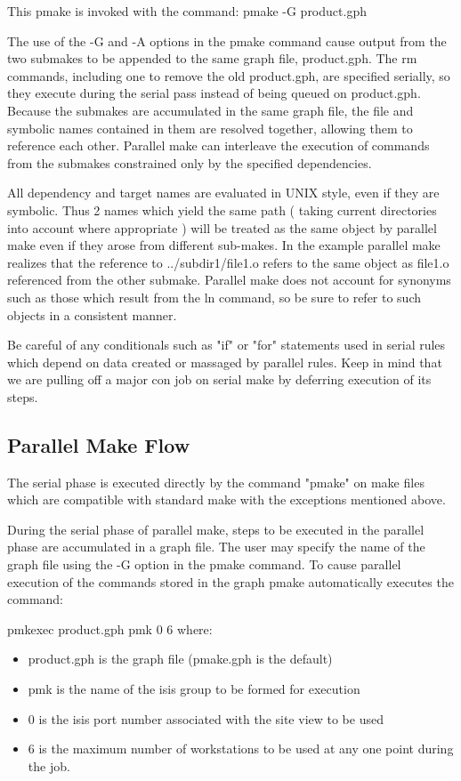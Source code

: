 This pmake is invoked with the command:
          pmake -G product.gph

The use of the -G and -A options in the pmake command cause output from the two
submakes to be appended to the same graph file, product.gph.  The rm commands,
including one to remove the old product.gph, are specified serially, so they
execute during the serial pass instead of being queued on product.gph.  Because
the submakes are accumulated in the same graph file, the file and symbolic
names contained in them are resolved together, allowing them to reference each
other.  Parallel make can interleave the execution of commands from the
submakes constrained only by the specified dependencies.
 
All dependency and target names are evaluated in UNIX style, even if they are
symbolic.  Thus 2 names which yield the same path ( taking current directories
into account where appropriate ) will be treated as the same object by parallel
make even if they arose from different sub-makes.  In the example parallel make
realizes that the reference to ../subdir1/file1.o refers to the same object as
file1.o referenced from the other submake.  Parallel make does not account for
synonyms such as those which result from the ln command, so be sure to refer to
such objects in a consistent manner.
 
Be careful of any conditionals such as "if" or "for" statements used in serial
rules which depend on data created or massaged by parallel rules.  Keep in mind
that we are pulling off a major con job on serial make by deferring execution
of its steps.

 
\subsection*{Parallel Make Flow}
 
The serial phase is executed directly by the command "pmake" on make files
which are compatible with standard make with the exceptions mentioned above.
 
During the serial phase of parallel make, steps to be executed in the parallel
phase are accumulated in a graph file.  The user may specify the name of the
graph file using the -G option in the pmake command.  To cause parallel
execution of the commands stored in the graph pmake automatically executes the
command:
 
    pmkexec product.gph pmk 0 6
where:
\begin{itemize}
\item product.gph is the graph file (pmake.gph is the default)
\item pmk is the name of the isis group to be formed for execution
\item 0 is the isis port number associated with the site view to be used
\item 6 is the maximum number of workstations to be used at any one point
during the job.
\end{itemize}

